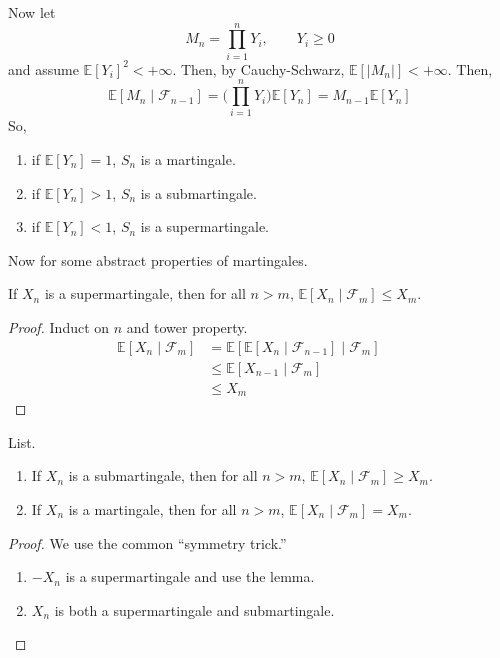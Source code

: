 	\begin{example}
	  Now let 
		\begin{equation}
			M_n = \prod_{i=1}^n Y_i, \qquad Y_i \geq 0
		\end{equation}
		and assume $\mathbb{E}[Y_i]^2 < +\infty$. Then, by Cauchy-Schwarz, $\mathbb{E}[|M_n|] < +\infty$. Then, 
		\begin{equation}
			\mathbb{E}[M_n \mid \mathscr{F}_{n-1}] = \bigg( \prod_{i=1}^n Y_i \bigg) \mathbb{E}[Y_n] = M_{n-1} \mathbb{E}[Y_n]
		\end{equation}
		So, 
		\begin{enumerate}
			\item if $\mathbb{E}[Y_n] = 1$, $S_n$ is a martingale. 
			\item if $\mathbb{E}[Y_n] > 1$, $S_n$ is a submartingale. 
			\item if $\mathbb{E}[Y_n] < 1$, $S_n$ is a supermartingale. 
		\end{enumerate}
	\end{example}

	Now for some abstract properties of martingales. 

	\begin{lemma} 
		If $X_n$ is a supermartingale, then for all $n > m$, $\mathbb{E}[X_n \mid \mathscr{F}_m] \leq X_m$.
	\end{lemma}
	\begin{proof}
	  Induct on $n$ and tower property. 
		\begin{align}
			\mathbb{E}[X_n \mid \mathscr{F}_m] & = \mathbb{E}[\mathbb{E}[X_n \mid \mathscr{F}_{n-1}] \mid \mathscr{F}_m ] && \tag{Tower Property} \\ 
																				 & \leq \mathbb{E}[X_{n-1} \mid \mathscr{F}_m ] && \tag{By Definition} \\ 
																				 & \leq X_m && \tag{Inductive Hypothesis}
		\end{align}
	\end{proof}

	\begin{corollary}
	  List. 
		\begin{enumerate}
			\item If $X_n$ is a submartingale, then for all $n > m$, $\mathbb{E}[X_n \mid \mathscr{F}_m] \geq X_m$. 
			\item If $X_n$ is a  martingale, then for all $n > m$, $\mathbb{E}[X_n \mid \mathscr{F}_m] = X_m$. 
		\end{enumerate}
	\end{corollary}
	\begin{proof}
		We use the common ``symmetry trick.''
		\begin{enumerate}
		  \item $-X_n$ is a supermartingale and use the lemma. 
			\item $X_n$ is both a supermartingale and submartingale. 
		\end{enumerate}
	\end{proof}

